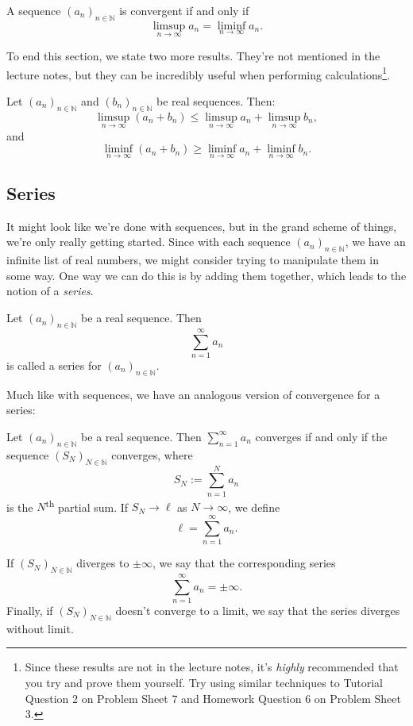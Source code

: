 \documentclass[
  12pt,
  a4paper]{extarticle}
\theoremstyle{plain}
\theoremstyle{definition}
\theoremstyle{plain}
\theoremstyle{plain}
\theoremstyle{plain}
\theoremstyle{plain}
\theoremstyle{definition}
\theoremstyle{definition}
\theoremstyle{remark}
\theoremstyle{remark}
\let\BeginKnitrBlock\begin \let\EndKnitrBlock\end
\renewcommand{\;}{\,}
\begin{document}
\BeginKnitrBlock{theorem}
{\label{thm:thm1} }A sequence \((a_n)_{n\in\mathbb{N}}\) is convergent if and only if \[\limsup_{n \to \infty} a_n = \liminf_{n \to \infty} a_n.\]
\EndKnitrBlock{theorem}
To end this section, we state two more results. They're not mentioned in the lecture notes, but they can be incredibly useful when performing calculations\footnote{Since these results are not in the lecture notes, it's \emph{highly} recommended that you try and prove them yourself. Try using similar techniques to Tutorial Question 2 on Problem Sheet 7 and Homework Question 6 on Problem Sheet 3.}.

\BeginKnitrBlock{theorem}
{\label{thm:thm2} }Let \((a_n)_{n\in\mathbb{N}}\) and \((b_n)_{n\in\mathbb{N}}\) be real sequences. Then: \[\limsup_{n\to\infty}(a_n + b_n) \leq \limsup_{n\to\infty}a_n +\limsup_{n\to\infty}b_n,\] and \[\liminf_{n\to\infty}(a_n + b_n) \geq \liminf_{n\to\infty}a_n +\liminf_{n\to\infty}b_n.\]
\EndKnitrBlock{theorem}

\hypertarget{series}{%
\subsection{Series}\label{series}}

It might look like we're done with sequences, but in the grand scheme of things, we're only really getting started. Since with each sequence \((a_n)_{n\in\mathbb{N}}\), we have an infinite list of real numbers, we might consider trying to manipulate them in some way. One way we can do this is by adding them together, which leads to the notion of a \emph{series}.

\BeginKnitrBlock{definition}[Series]
{\label{def:def1} }Let \((a_n)_{n \in \mathbb{N}}\) be a real sequence. Then \[\sum_{n = 1}^{\infty} a_n\] is called a series for \((a_n)_{n\in\mathbb{N}}\).
\EndKnitrBlock{definition}

Much like with sequences, we have an analogous version of convergence for a series:
\BeginKnitrBlock{definition}[Series Convergence and Partial Sums]
{\label{def:def2} }Let \((a_n)_{n \in \mathbb{N}}\) be a real sequence. Then \(\sum_{n = 1}^{\infty} a_n\) converges if and only if the sequence \((S_N)_{N \in \mathbb{N}}\) converges, where \[S_N:= \sum_{n = 1}^{N} a_n\] is the \(N\)\textsuperscript{th} partial sum. If \(S_N \to \ell\) as \(N \to \infty\), we define \[\ell = \sum_{n = 1}^{\infty}a_n.\]
\EndKnitrBlock{definition}
If \((S_N)_{N\in\mathbb{N}}\) diverges to \(\pm\infty\), we say that the corresponding series \[\sum_{n=1}^{\infty} a_n = \pm\infty.\] Finally, if \((S_N)_{N\in\mathbb{N}}\) doesn't converge to a limit, we say that the series diverges without limit.
\end{document}
